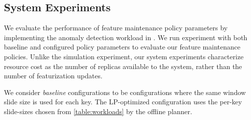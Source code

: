 



\subsection{System Experiments}
\label{ss:evaluation:results}
We evaluate the performance of feature maintenance policy parameters by implementing the anomaly detection workload in \system{}. We run experiment with both baseline and configured policy parameters to evaluate our feature maintenance policies. Unlike the simulation experiment, our system experiments characterize resource cost as the number of replicas available to the system, rather than the number of featurization updates. 

We consider \textit{baseline} configurations to be configurations where the same window slide size is used for each key. The LP-optimized configuration uses the per-key slide-sizes chosen from \ref{table:workloads} by the offline planner. 


